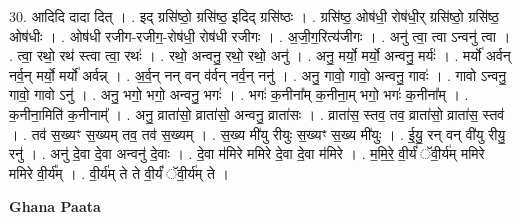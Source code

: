 \documentclass[17pt]{extarticle}
\begin{document}
30. आदिदि दादा दित् । . इद् ग्रसि॑ष्ठो॒ ग्रसि॑ष्ठ॒ इदिद् ग्रसि॑ष्ठः । . ग्रसि॑ष्ठ॒ ओष॑धी॒ रोष॑धी॒र् ग्रसि॑ष्ठो॒ ग्रसि॑ष्ठ॒ ओष॑धीः । . ओष॑धी रजीग-रजीग॒-रोष॑धी॒ रोष॑धी रजीगः । . अ॒जी॒ग॒रित्य॑जीगः । . अनु॑ त्वा॒ त्वा ऽन्वनु॑ त्वा । . त्वा॒ रथो॒ रथ॑ स्त्वा त्वा॒ रथः॑ । . रथो॒ अन्वनु॒ रथो॒ रथो॒ अनु॑ । . अनु॒ मर्यो॒ मर्यो॒ अन्वनु॒ मर्यः॑ । . मर्यो॑ अर्वन् नर्व॒न् मर्यो॒ मर्यो॑ अर्वन्न् । . अ॒र्व॒न् नन् वन् व॑र्वन् नर्व॒न् ननु॑ । . अनु॒ गावो॒ गावो॒ अन्वनु॒ गावः॑ । . गावो ऽन्वनु॒ गावो॒ गावो ऽनु॑ । . अनु॒ भगो॒ भगो॒ अन्वनु॒ भगः॑ । . भगः॑ क॒नीना᳚म् क॒नीना॒म् भगो॒ भगः॑ क॒नीना᳚म् । . क॒नीना॒मिति॑ क॒नीनाम्᳚ । . अनु॒ व्राता॑सो॒ व्राता॑सो॒ अन्वनु॒ व्राता॑सः । . व्राता॑स॒ स्तव॒ तव॒ व्राता॑सो॒ व्राता॑स॒ स्तव॑ । . तव॑ स॒ख्यꣳ स॒ख्यम् तव॒ तव॑ स॒ख्यम् । . स॒ख्य मी॑यु रीयुः स॒ख्यꣳ स॒ख्य मी॑युः । . ई॒यु॒ रन् वन् वी॑यु रीयु॒ रनु॑ । . अनु॑ दे॒वा दे॒वा अन्वनु॑ दे॒वाः । . दे॒वा म॑मिरे ममिरे दे॒वा दे॒वा म॑मिरे । . म॒मि॒रे॒ वी॒र्यं॑ ॅवी॒र्य॑म् ममिरे ममिरे वी॒र्य᳚म् । . वी॒र्य॑म् ते ते वी॒र्यं॑ ॅवी॒र्य॑म् ते । \newline

\textbf{Ghana Paata } \newline
\end{document}
